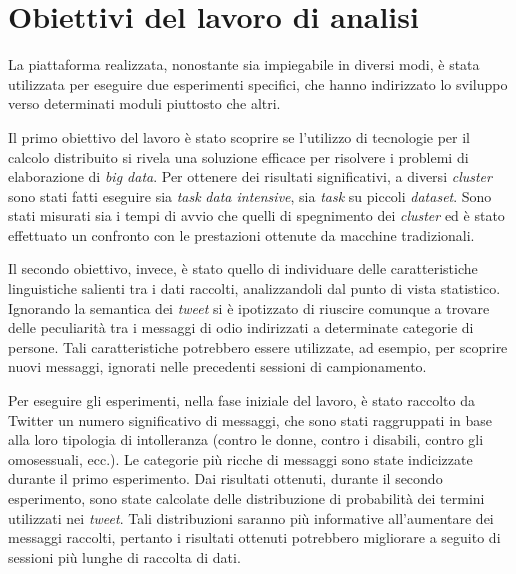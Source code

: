 \section{Obiettivi del lavoro di analisi}
\label{par:method}

La piattaforma realizzata, nonostante sia impiegabile in diversi modi, è stata utilizzata per eseguire due esperimenti specifici, che hanno indirizzato lo sviluppo verso 
determinati moduli piuttosto che altri.

Il primo obiettivo del lavoro è stato scoprire se l'utilizzo di tecnologie per il calcolo distribuito si rivela una soluzione efficace per risolvere i problemi di elaborazione di \textit{big data}.
Per ottenere dei risultati significativi, a diversi \textit{cluster} sono stati fatti eseguire sia \textit{task} \textit{data intensive}, sia \textit{task} su piccoli \textit{dataset}. 
Sono stati misurati sia i tempi di avvio che quelli di spegnimento dei \textit{cluster} ed è stato effettuato un confronto con le prestazioni ottenute da macchine tradizionali.

Il secondo obiettivo, invece, è stato quello di individuare delle caratteristiche linguistiche salienti tra i dati raccolti, 
analizzandoli dal punto di vista statistico. Ignorando la semantica dei \textit{tweet} si è ipotizzato di riuscire comunque a trovare delle peculiarità tra i messaggi 
di odio indirizzati a determinate categorie di persone. Tali caratteristiche potrebbero essere utilizzate, ad esempio, per scoprire nuovi messaggi, ignorati
nelle precedenti sessioni di campionamento.

Per eseguire gli esperimenti, nella fase iniziale del lavoro, è stato raccolto da Twitter un numero significativo di messaggi, che sono stati raggruppati in base alla loro tipologia
di intolleranza (contro le donne, contro i disabili, contro gli omosessuali, ecc.). Le categorie più ricche di messaggi sono state indicizzate durante il primo esperimento. Dai risultati ottenuti, 
durante il secondo esperimento, sono state calcolate delle distribuzione di probabilità dei termini utilizzati nei \textit{tweet}.
Tali distribuzioni saranno più informative all’aumentare dei messaggi raccolti, pertanto i risultati ottenuti potrebbero migliorare a seguito di sessioni più lunghe di raccolta di dati.

